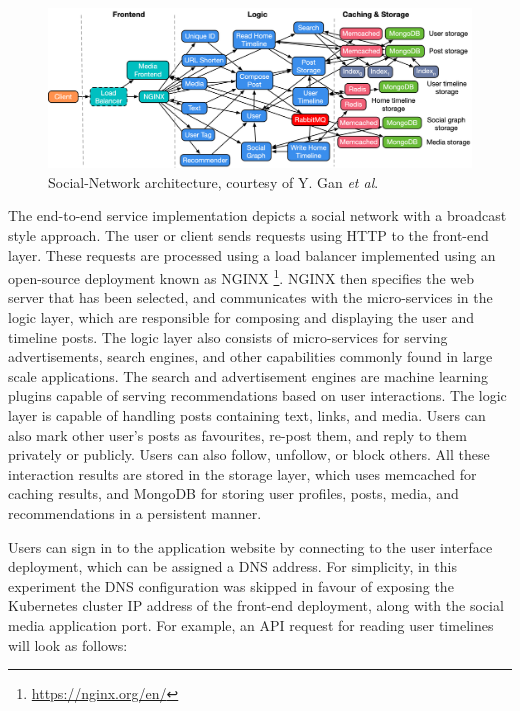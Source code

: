 \begin{figure}[htb]
    \centering
    \caption{Social-Network architecture, courtesy of Y. Gan \textit{et al}. \cite{gan2019open}}
    \label{fig:social-network-arch}
    \includegraphics[width=1.0\linewidth]{Figures/Social-Network-Architecture.pdf}
\end{figure}

The end-to-end service implementation depicts a social network with a broadcast style approach. The user or client sends requests using HTTP to the front-end layer. These requests are processed using a load balancer implemented using an open-source deployment known as NGINX \footnote{\url{https://nginx.org/en/}}. NGINX then specifies the web server that has been selected, and communicates with the micro-services in the logic layer, which are responsible for composing and displaying the user and timeline posts. The logic layer also consists of micro-services for serving advertisements, search engines, and other capabilities commonly found in large scale applications. The search and advertisement engines are machine learning plugins capable of serving recommendations based on user interactions. The logic layer is capable of handling posts containing text, links, and media. Users can also mark other user's posts as favourites, re-post them, and reply to them privately or publicly. Users can also follow, unfollow, or block others. All these interaction results are stored in the storage layer, which uses memcached for caching results, and MongoDB for storing user profiles, posts, media, and recommendations in a persistent manner.

Users can sign in to the application website by connecting to the user interface deployment, which can be assigned a DNS address. For simplicity, in this experiment the DNS configuration was skipped in favour of exposing the Kubernetes cluster IP address of the front-end deployment, along with the social media application port. For example, an API request for reading user timelines will look as follows:\par

